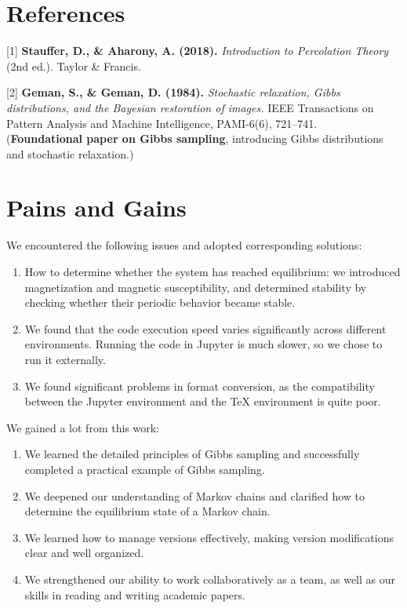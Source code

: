 \documentclass[11pt]{article}
\providecommand{\tightlist}{%
      \setlength{\itemsep}{0pt}\setlength{\parskip}{0pt}}
\begin{document}
    \section{References}\label{references}

{[}1{]} \textbf{Stauffer, D., \& Aharony, A. (2018).} \emph{Introduction
to Percolation Theory} (2nd ed.). Taylor \& Francis.

{[}2{]} \textbf{Geman, S., \& Geman, D. (1984).} \emph{Stochastic
relaxation, Gibbs distributions, and the Bayesian restoration of
images.} IEEE Transactions on Pattern Analysis and Machine Intelligence,
PAMI-6(6), 721--741.\\
(\textbf{Foundational paper on Gibbs sampling}, introducing Gibbs
distributions and stochastic relaxation.)

    \section{Pains and Gains}\label{pains-and-gains}

We encountered the following issues and adopted corresponding solutions:

\begin{enumerate}
\def\labelenumi{\arabic{enumi}.}
\tightlist
\item
  How to determine whether the system has reached equilibrium: we
  introduced magnetization and magnetic susceptibility, and determined
  stability by checking whether their periodic behavior became stable.
\item
  We found that the code execution speed varies significantly across
  different environments. Running the code in Jupyter is much slower, so
  we chose to run it externally.
\item
  We found significant problems in format conversion, as the
  compatibility between the Jupyter environment and the TeX environment
  is quite poor.
\end{enumerate}

We gained a lot from this work:

\begin{enumerate}
\def\labelenumi{\arabic{enumi}.}
\tightlist
\item
  We learned the detailed principles of Gibbs sampling and successfully
  completed a practical example of Gibbs sampling.
\item
  We deepened our understanding of Markov chains and clarified how to
  determine the equilibrium state of a Markov chain.
\item
  We learned how to manage versions effectively, making version
  modifications clear and well organized.
\item
  We strengthened our ability to work collaboratively as a team, as well
  as our skills in reading and writing academic papers.
\end{enumerate}
\end{document}
